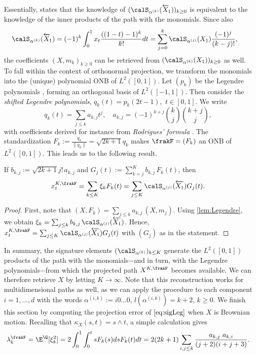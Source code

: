 Essentially,   states that the knowledge of $(\calS_{\alpha^{(k)}}(\overleftarrow{X}_{\! 1}))_{k\ge 0}$ is equivalent to the knowledge of the inner products of the path with the monomials. Since  also 
\begin{align*}
    \calS_{\alpha^{(k)}}(\overleftarrow{X}_{\! 1})
    &= (-1)^{k}\int_0^1 x_t \frac{((1-t)-1)^{k}}{k!}dt 
    = \sum_{j=0}^{k} \calS_{\alpha^{(j)}}(X_1) \frac{(-1)^{j}}{(k-j)!},
\end{align*}
the coefficients $(X,m_k)_{k\ge 0}$ can be retrieved from $(\calS_{\alpha^{(k)}}(X_1))_{k\ge 0}$ as well. 
To fall within the context of orthonormal projection, we transform the monomials into the (unique) polynomial ONB of $L^2([0,1])$. 
Let $(p_k)$ be the Legendre polynomials \cite{Szego}, forming an orthogonal basis of $L^2([-1,1])$. Then  consider the \textit{shifted Legendre polynomials},  $q_k(t) = p_k(2t-1),$  $t\in [0,1].$ 
We write 
$$q_k(t)= \sum_{j\le k} a_{k,j}t^j, \quad a_{k,j} = (-1)^{k+j} {k \choose j} {k + j \choose j},$$ with coefficients  derived for instance from  \textit{Rodrigues' formula} \cite[Section 4.3]{Szego}. The standardization $F_k :=  \frac{q_k}{\lVert q_k\rVert} = \sqrt{2k+1}q_k$ makes $\frakF = (F_k)$ an ONB of $L^2([0,1])$. This leads us to the following result. 
\begin{proposition}
If  $b_{k,j} := \sqrt{2k+1} j!\, a_{k,j}$ and $G_j(t) := \sum_{k= j}^K b_{k,j}\,  F_k(t)$, then 
\begin{equation}\label{eq:sigLeg}
    x^{K,\frakF}_t 
    = \sum_{k\le K} \xi_k F_k(t)
    =  \sum_{j \le K} \calS_{\alpha^{(j)}}(\overleftarrow{X_1})  G_j(t).
\end{equation}
\end{proposition}

\begin{proof}
 First, note that $(X,F_k) = \sum_{j\le k} a_{k,j}\, (X,m_j)$.   Using \cref{lem:Legendre}, we obtain 
$\xi_k = \sum_{j \le k} b_{k,j}\, \calS_{\alpha^{(j)}}(\overleftarrow{X_1})$. Hence,   $ x^{K,\frakF}_t   = \sum_{j \le K} \calS_{\alpha^{(j)}}(\overleftarrow{X_1})  G_j(t)$ with $(G_j)$ as in the statement.
\end{proof}
In summary, the signature elements $(\calS_{\alpha^{(k)}})_{k\le K}$ generate the $L^2([0,1])$ products of the path with the monomials$-$and in turn, with the Legendre polynomials$-$from which the projected path $X^{K,\frakF} $ becomes available. 
We can therefore retrieve $X$ by letting $K\to \infty$. Note that this reconstruction  works for multidimensional paths as well, as we can apply the procedure to each component  $i=1,\ldots,d$ with the words
$\alpha^{(i,k)} :=i 0\ldots0$, $l(\alpha^{(i,k)}) = k+2$, $k \ge 0$.  
We finish this section by computing the projection error of $\eqref{eq:sigLeg}$ when $X$ is Brownian motion. Recalling that $\kappa_X(s,t) = s \wedge t$,  a  simple calculation gives 
$$\lambda_k^{\frakF} = \E^{\Q}[\xi_k^2] = 2 \int_{0}^1 \int_{0}^t s  F_k(s)dsF_k(t)dt = 2 (2k+1)\sum_{i,j \le k} \frac{a_{k,j}\ a_{k,i}}{(j+2)(i+j+3)}.
$$
 
